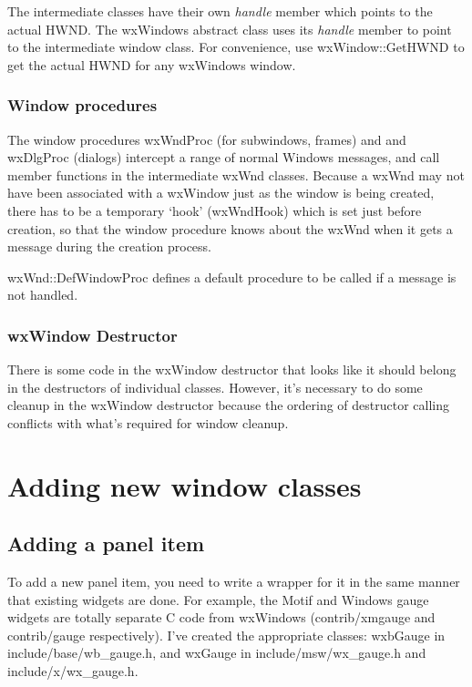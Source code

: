 The intermediate classes have their own {\it handle} member which points
to the actual HWND. The wxWindows abstract class uses its {\it handle} member
to point to the intermediate window class. For convenience, use wxWindow::GetHWND to
get the actual HWND for any wxWindows window.

\subsection{Window procedures}

The window procedures wxWndProc (for subwindows, frames) and and wxDlgProc (dialogs)
intercept a range of normal Windows messages, and call member functions in the
intermediate wxWnd classes. Because a wxWnd may not have been associated with
a wxWindow just as the window is being created, there has to be a temporary
`hook' (wxWndHook) which is set just before creation, so that the window
procedure knows about the wxWnd when it gets a message during the creation
process.

wxWnd::DefWindowProc defines a default procedure to be called if a message
is not handled.

\subsection{wxWindow Destructor}

There is some code in the wxWindow destructor that looks like it should belong
in the destructors of individual classes. However, it's necessary to do some cleanup
in the wxWindow destructor because the ordering of destructor calling conflicts
with what's required for window cleanup.

\chapter{Adding new window classes}

\section{Adding a panel item}

To add a new panel item, you need to write a wrapper for it in the same manner that
existing widgets are done. For example, the Motif and Windows gauge widgets are
totally separate C code from wxWindows (contrib/xmgauge and
contrib/gauge respectively). I've created the appropriate classes: wxbGauge
in include/base/wb\_gauge.h, and wxGauge in include/msw/wx\_gauge.h and
include/x/wx\_gauge.h.

